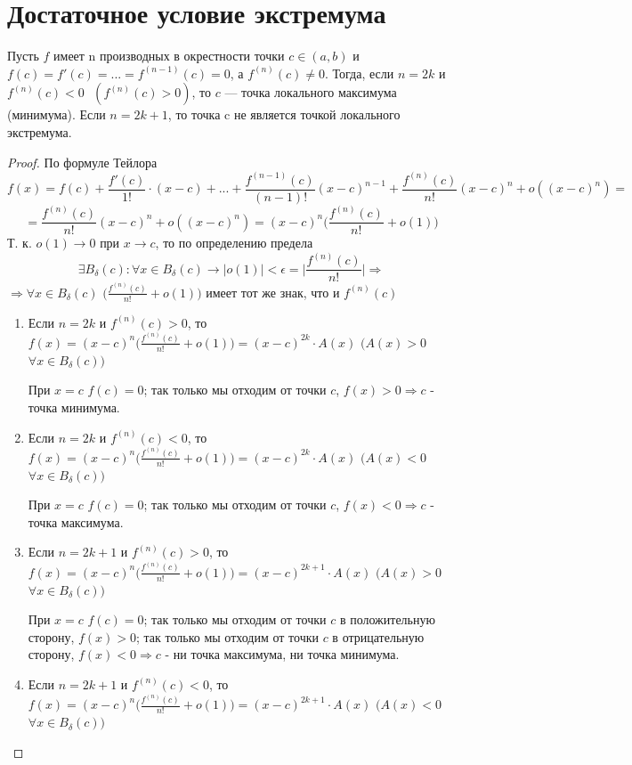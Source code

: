 	\section{Достаточное условие экстремума}

	
	\begin{theorem}
		Пусть $f$ имеет n производных в окрестности точки $c \in (a, b)$ и $f(c) = f'(c) = ... = f^{(n - 1)}(c) = 0$, а $f^{(n)}(c) \neq 0$. Тогда, если $n = 2k$ и $f^{(n)}(c) < 0 \text{ } (f^{(n)}(c) > 0)$, то $c$ — точка локального максимума (минимума). Если $n = 2k + 1$, то точка c не является точкой локального экстремума.
	\end{theorem}
	
	\begin{proof}
		По формуле Тейлора
		\[ f(x) = f(c) + \frac{f'(c)}{1!} \cdot (x - c) + ... + \frac{f^{(n - 1)}(c)}{(n - 1)!}(x - c)^{n - 1} + \frac{f^{(n)}(c)}{n!}(x - c)^n + o((x - c)^n) = \]
		\[ = \frac{f^{(n)}(c)}{n!}(x - c)^n + o((x - c)^n) = (x - c)^n \bigg(\frac{f^{(n)}(c)}{n!} + o(1)\bigg) \]
		Т. к. $o(1) \to 0$ при $x \to c$, то по определению предела
		\[ \exists B_{\delta}(c): \forall x \in B_{\delta}(c) \rightarrow |o(1)| < \epsilon = \bigg|\frac{f^{(n)}{(c)}}{n!}\bigg| \Rightarrow \]
		$\Rightarrow \forall x \in B_{\delta}(c)$ $\big(\frac{f^{(n)}(c)}{n!} + o(1)\big)$ имеет тот же знак, что и $f^{(n)}(c)$
		\begin{enumerate}
			\item Если $n = 2k$ и $f^{(n)}(c) > 0$, то $f(x) = (x - c)^n \big(\frac{f^{(n)}(c)}{n!} + o(1)\big) = (x - c)^{2k} \cdot A(x)$ $(A(x) > 0$ $\forall x \in B_{\delta}(c))$
			
			При $x = c$ $f(c) = 0$; так только мы отходим от точки $c$, $f(x) > 0 \Rightarrow c$ - точка минимума.
			\item Если $n = 2k$ и $f^{(n)}(c) < 0$, то $f(x) = (x - c)^n \big(\frac{f^{(n)}(c)}{n!} + o(1)\big) = (x - c)^{2k} \cdot A(x)$ $(A(x) < 0$ $\forall x \in B_{\delta}(c))$
			
			При $x = c$ $f(c) = 0$; так только мы отходим от точки $c$, $f(x) < 0 \Rightarrow c$ - точка максимума.
			\item Если $n = 2k + 1$ и $f^{(n)}(c) > 0$, то $f(x) = (x - c)^n \big(\frac{f^{(n)}(c)}{n!} + o(1)\big) = (x - c)^{2k + 1} \cdot A(x)$ $(A(x) > 0$ $\forall x \in B_{\delta}(c))$
			
			При $x = c$ $f(c) = 0$; так только мы отходим от точки $c$ в положительную сторону, $f(x) > 0$; так только мы отходим от точки $c$ в отрицательную сторону, $f(x) < 0 \Rightarrow c$ - ни точка максимума, ни точка минимума.
			\item Если $n = 2k + 1$ и $f^{(n)}(c) < 0$, то $f(x) = (x - c)^n \big(\frac{f^{(n)}(c)}{n!} + o(1)\big) = (x - c)^{2k + 1} \cdot A(x)$ $(A(x) < 0$ $\forall x \in B_{\delta}(c))$
			

\end{enumerate}
\end{proof}
